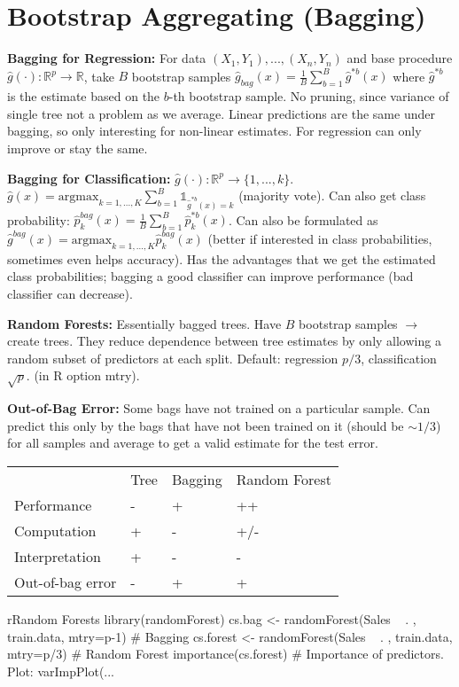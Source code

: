 \section*{Bootstrap Aggregating (Bagging)}
\textbf{Bagging for Regression:} For data $(X_1,Y_1),...,(X_n,Y_n)$ and base procedure $\hat g(\cdot): \mathbb{R}^p\to \mathbb{R}$, take $B$ bootstrap samples $\hat g_{bag}(x) = \tfrac 1 B \sum_{b=1}^B \hat g^{*b}(x)$ where $\hat g^{*b}$ is the estimate based on the $b$-th bootstrap sample. No pruning, since variance of single tree not a problem as we average. Linear predictions are the same under bagging, so only interesting for non-linear estimates. For regression can only improve or stay the same.

\textbf{Bagging for Classification:}
$\hat g(\cdot): \mathbb{R}^p \to \{1, ..., k\}$. $\hat g (x) = \text{argmax}_{k=1,...,K} \sum_{b=1}^B \mathds{1}_{\hat g^{*b}(x)=k}$ (majority vote).
Can also get class probability: $\hat p_k^{bag}(x) = \tfrac{1}{B} \sum_{b=1}^B \hat p_k^{*b}(x)$.
Can also be formulated as $\hat g^{bag}(x) = \text{argmax}_{k=1,...,K} \hat p_k^{bag}(x)$ (better if interested in class probabilities, sometimes even helps accuracy).
Has the advantages that we get the estimated class probabilities; bagging a good classifier can improve performance (bad classifier can decrease).

\textbf{Random Forests:}
Essentially bagged trees. Have $B$ bootstrap samples $\to$ create trees.
They reduce dependence between tree estimates by only allowing a random subset of predictors at each split.
Default: regression $p/3$, classification $\sqrt{p}$. (in R option mtry).

\textbf{Out-of-Bag Error:}
Some bags have not trained on a particular sample.
Can predict this only by the bags that have not been trained on it (should be $\sim 1/3$) for all samples and average to get a valid estimate for the test error.

\begin{tabular}{llll}
                   & Tree & Bagging & Random Forest \\
  Performance      & -    & +       & ++            \\
  Computation      & +    & -       & +/-           \\
  Interpretation   & +    & -       & -             \\
  Out-of-bag error & -    & +       & +
\end{tabular}%

\begin{codebox}{r}{Random Forests}
  library(randomForest)
  cs.bag <- randomForest(Sales ~ . , train.data, mtry=p-1) # Bagging
  cs.forest <- randomForest(Sales ~ . , train.data, mtry=p/3) # Random Forest
  importance(cs.forest) # Importance of predictors. Plot: varImpPlot(...
\end{codebox}
